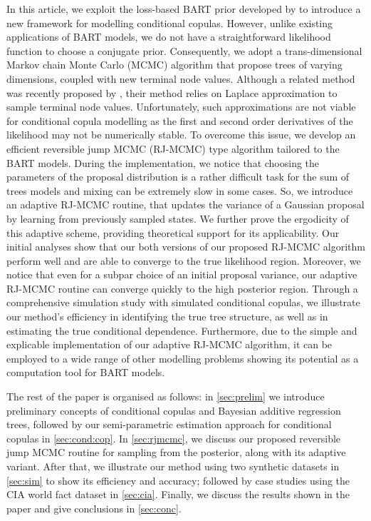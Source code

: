 \documentclass[
12pt]{article}
\begin{document}
	In this article, we exploit the loss-based BART prior developed by \citet{serafini2024lossbasedpriortreetopologies} to introduce a new framework for modelling conditional copulas. However, unlike existing applications of BART models, we do not have a straightforward likelihood function to choose a conjugate prior. Consequently, we adopt a trans-dimensional Markov chain Monte Carlo (MCMC) algorithm that propose trees of varying dimensions, coupled with new terminal node values. Although a related method was recently proposed by \citet{Linero02012025}, their method relies on Laplace approximation to sample terminal node values. Unfortunately, such approximations are not viable for conditional copula modelling as the first and second order derivatives of the likelihood may not be numerically stable. To overcome this issue, we develop an efficient reversible jump MCMC (RJ-MCMC) type algorithm \citep{green_RJMCMC} tailored to the BART models. During the implementation, we notice that choosing the parameters of the proposal distribution is a rather difficult task for the sum of trees models and mixing can be extremely slow in some cases. So, we introduce an adaptive RJ-MCMC routine, that updates the variance of a Gaussian proposal by learning from previously sampled states. We further prove the ergodicity of this adaptive scheme, providing theoretical support for its applicability. Our initial analyses show that our both versions of our proposed RJ-MCMC algorithm perform well and are able to converge to the true likelihood region. Moreover, we notice that even for a subpar choice of an initial proposal variance, our adaptive RJ-MCMC routine can converge quickly to the high posterior region. Through a comprehensive simulation study with simulated conditional copulas, we illustrate our method's efficiency in identifying the true tree structure, as well as in estimating the true conditional dependence. Furthermore, due to the simple and explicable implementation of our adaptive RJ-MCMC algorithm, it can be employed to a wide range of other modelling problems showing its potential as a computation tool for BART models. 
	
	The rest of the paper is organised as follows: in \cref{sec:prelim} we introduce preliminary concepts of conditional copulas and Bayesian additive regression trees, followed by our semi-parametric estimation approach for conditional copulas in \cref{sec:cond:cop}. In \cref{sec:rjmcmc}, we discuss our proposed reversible jump MCMC routine for sampling from the posterior, along with its adaptive variant. After that, we illustrate our method using two synthetic datasets in \cref{sec:sim} to show its efficiency and accuracy; followed by case studies using the CIA world fact dataset in \cref{sec:cia}. Finally, we discuss the results shown in the paper and give conclusions in \cref{sec:conc}.
	
\end{document}
